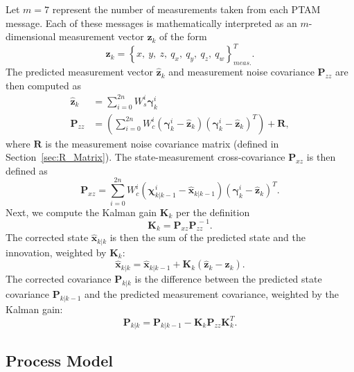 Let $m = 7$ represent the number of measurements taken from each PTAM message. Each of these messages is mathematically interpreted as an $m$-dimensional measurement vector $\mathbf{z}_{k}$ of the form
%
\begin{equation}
\mathbf{z}_{k} = \left\lbrace x,\ y,\ z,\ q_{x},\ q_{y},\ q_{z},\ q_{w} \right\rbrace ^{T} _{meas.} .
\end{equation}
%
The predicted measurement vector $\hat{\mathbf{z}}_{k}$ and measurement noise covariance $\mathbf{P}_{zz}$ are then computed as
%
\begin{align}
\hat{\mathbf{z}}_{k} &= \sum^{2n}_{i=0} W^{i}_{s} \bm{\gamma}^{i}_{k} \label{eq:zHat} \\
\mathbf{P}_{zz} &= \left( \sum^{2n}_{i=0} W^{i}_{c} \left( \bm{\gamma}^{i}_{k} - \hat{\mathbf{z}}_{k} \right) \left( \bm{\gamma}^{i}_{k} - \hat{\mathbf{z}}_{k} \right)^{T} \right) + \mathbf{R} , \label{eq:P_zz}
\end{align}
%
where $\mathbf{R}$ is the measurement noise covariance matrix (defined in Section~\ref{sec:R_Matrix}). The state-measurement cross-covariance $\mathbf{P}_{xz}$ is then defined as
%
\begin{equation} \label{eq:P_xz}
\mathbf{P}_{xz} = \sum^{2n}_{i=0} W^{i}_{c} \left( \bm{\chi}^{i}_{k | k-1} - \hat{\mathbf{x}}_{k | k-1} \right) \left( \bm{\gamma}^{i}_{k} - \hat{\mathbf{z}}_{k} \right)^{T} .
\end{equation}
%
Next, we compute the Kalman gain $\mathbf{K}_{k}$ per the definition
%
\begin{equation}
\mathbf{K}_{k} = \mathbf{P}_{xz} \mathbf{P}^{\,-1}_{zz}.
\end{equation}
%
The corrected state $\hat{\mathbf{x}}_{k | k}$ is then the sum of the predicted state and the innovation, weighted by $\mathbf{K}_{k}$:
%
\begin{equation}
\hat{\mathbf{x}}_{k | k} = \hat{\mathbf{x}}_{k | k-1} + \mathbf{K}_{k} \left( \hat{\mathbf{z}}_{k} - \mathbf{z}_{k} \right) .
\end{equation}
%
The corrected covariance $\mathbf{P}_{k | k}$ is the difference between the predicted state covariance $\mathbf{P}_{k | k-1}$ and the predicted measurement covariance, weighted by the Kalman gain:
%
\begin{equation}
\mathbf{P}_{k | k} = \mathbf{P}_{k | k-1} - \mathbf{K}_{k} \mathbf{P}_{zz} \mathbf{K}_{k}^{T} .
\end{equation}

\subsection{Process Model} \label{Process_Model}

